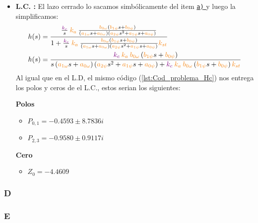 \begin{itemize}
    \item \textbf{L.C. :} El lazo cerrado lo sacamos simbólicamente del item \hyperref[pregunta-a]{\texttt{a)} } y luego la simplificamos:
    \begin{align*}
        &h(s) = \dfrac{  \frac{\mora{k_c}}{s} \nara{k_a} \frac{\nara{\nara{b_{0\omega}}}\left(\nara{b_{1\psi}}s + \nara{b_{0\psi}}\right)}
        {\left(\nara{a_{1\omega}}s + \nara{a_{0\omega}}\right)\left(\nara{a_{2\psi}}s^{2} + \nara{a_{1\psi}}s + \nara{a_{0\psi}}\right)}   }{  1+  \frac{\mora{k_c}}{s} \nara{k_a} \frac{\nara{\nara{b_{0\omega}}}\left(\nara{b_{1\psi}}s + \nara{b_{0\psi}}\right)}
        {\left(\nara{a_{1\omega}}s + \nara{a_{0\omega}}\right)\left(\nara{a_{2\psi}}s^{2} + \nara{a_{1\psi}}s + \nara{a_{0\psi}}\right)}\nara{k_{st}}  } \\
        &h(s) = \dfrac{     \mora{k_c} \nara{k_a}    \nara{\nara{b_{0\omega}}}\left(\nara{b_{1\psi}}s + \nara{b_{0\psi}}\right)    }{    s \left(\nara{a_{1\omega}}s + \nara{a_{0\omega}}\right)\left(\nara{a_{2\psi}}s^{2} + \nara{a_{1\psi}}s + \nara{a_{0\psi}}\right)    + \mora{k_c} \nara{k_a}     \nara{\nara{b_{0\omega}}}\left(\nara{b_{1\psi}}s + \nara{b_{0\psi}}\right)   
       \nara{k_{st}}   }
    \end{align*}
    Al igual que en el L.D, el mismo código (\autoref{lst:Cod_problema_Hc}) nos entrega los polos y ceros de el L.C., estos serian los siguientes:
    \begin{multicols}{2}
        \textbf{Polos}
        \begin{itemize}
            \item \(P_{0,1} = -0.4593 \pm 8.7836i\) 
            \item \(P_{2,3} = -0.9580 \pm 0.9117i\) 
        \end{itemize}
        \columnbreak
        \textbf{Cero}
        \begin{itemize}
            \item \(Z_0 = -4.4609\)
        \end{itemize}
      \end{multicols}
\end{itemize}


\FloatBarrier
\subsubsection{D}%

\FloatBarrier
\subsubsection{E}%

